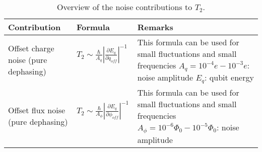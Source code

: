 \documentclass[]{article}
\begin{document}
\begin{table}[h]
\hspace*{-2cm}
\centering
\begin{tabular}{|p{2cm}|p{5.5cm}|p{7.5cm}|}
	\hline 
Contribution	& Formula & Remarks \\ 
	\hline \hline 
Offset charge noise (pure dephasing)& $T_2 \sim \frac{\hbar}{A_q} \left| \frac{\partial E_q}{\partial q_{off}} \right|^{-1} $~\cite{koch2007} & This formula can be used for small fluctuations and small frequencies \newline
 $A_q = 10^{-4}e - 10^{-3}e$: noise amplitude \newline
 $E_q$: qubit energy \\
\hline 
Offset flux noise (pure dephasing)& $T_2 \sim \frac{\hbar}{A_{\phi}} \left| \frac{\partial E_q}{\partial \phi_{off}} \right|^{-1} $~\cite{koch2007} & This formula can be used for small fluctuations and small frequencies \newline
 $A_{\phi}= 10^{-6}\Phi_0 - 10^{-5}\Phi_0$: noise amplitude \\
\hline 
\end{tabular} 
\caption{Overview of the noise contributions to $T_2$.}
\label{tab:T_2}
\end{table}




\end{document}
